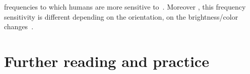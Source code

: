 
frequencies to which humans are more sensitive to~\cite{daly1992visible}. Moreover , this frequency sensitivity is different depending on the orientation, on the brightness/color changes~\cite{mantiuk2023hdr}.




\section*{Further reading and practice}
\vspace{0.25cm}

